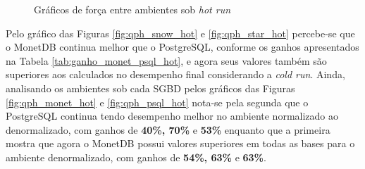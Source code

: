 \begin{figure}[htpb]
        \centering
        \caption{Gráficos de força entre ambientes sob \textit{hot run}}
        \label{fig:power_hot}
\end{figure}

Pelo gráfico das Figuras \ref{fig:qph_snow_hot} e \ref{fig:qph_star_hot} percebe-se que o MonetDB continua melhor que o PostgreSQL, conforme os ganhos apresentados na Tabela \ref{tab:ganho_monet_psql_hot}, e agora seus valores também são superiores aos calculados no desempenho final considerando a \textit{cold run}. Ainda, analisando os ambientes sob cada SGBD pelos gráficos das Figuras \ref{fig:qph_monet_hot} e \ref{fig:qph_psql_hot} nota-se pela segunda que o PostgreSQL continua tendo desempenho melhor no ambiente normalizado ao denormalizado, com ganhos de \textbf{40\%, 70\%} e \textbf{53\%} enquanto que a primeira mostra que agora o MonetDB possui valores superiores em todas as bases para o ambiente denormalizado, com ganhos de \textbf{54\%, 63\%} e \textbf{63\%}.


